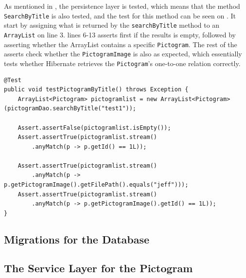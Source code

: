 As mentioned in , the persistence layer is tested, which  means that the method \texttt{SearchByTitle} is also tested, and the test for this method can be seen on .
It start by assigning what is returned by the \texttt{searchByTitle} method to an \texttt{ArrayList} on line 3.
lines 6-13 asserts first if the results is empty, followed by asserting whether the ArrayList contains a specific \texttt{Pictogram}.
The rest of the asserts check whether the \texttt{PictogramImage} is also as expected, which essentially tests whether Hibernate retrieves the \texttt{Pictogram}'s one-to-one relation correctly.

\begin{lstlisting}[float, floatplacement=h, caption={The test method which tests the method \texttt{SearchByTitle}.},label={lst:pictogramByTitleTest}]
@Test
public void testPictogramByTitle() throws Exception {
    ArrayList<Pictogram> pictogramlist = new ArrayList<Pictogram>(pictogramDao.searchByTitle("test1"));

    Assert.assertFalse(pictogramlist.isEmpty());
    Assert.assertTrue(pictogramlist.stream()
    	.anyMatch(p -> p.getId() == 1L));

    Assert.assertTrue(pictogramlist.stream()
    	.anyMatch(p -> p.getPictogramImage().getFilePath().equals("jeff")));
    Assert.assertTrue(pictogramlist.stream()
    	.anyMatch(p -> p.getPictogramImage().getId() == 1L));
}
\end{lstlisting}



\subsection{Migrations for the Database}

\subsection{The Service Layer for the Pictogram}
